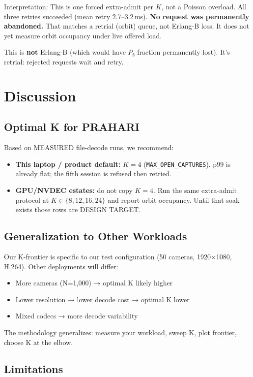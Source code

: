 \documentclass[sigconf,review]{acmart}
\begin{document}
Interpretation: This is one forced extra-admit per $K$, not a Poisson overload. All three retries succeeded (mean retry 2.7--3.2\,ms). \textbf{No request was permanently abandoned.} That matches a retrial (orbit) queue, not Erlang-B loss. It does not yet measure orbit occupancy under live offered load.

This is \textbf{not} Erlang-B (which would have $P_b$ fraction permanently lost). It's retrial: rejected requests wait
and retry.

\section{Discussion}

\subsection{Optimal K for PRAHARI}

Based on MEASURED file-decode runs, we recommend:
\begin{itemize}
  \item \textbf{This laptop / product default:} $K=4$ (\texttt{MAX\_OPEN\_CAPTURES}). p99 is already flat; the fifth session is refused then retried.
  \item \textbf{GPU/NVDEC estates:} do not copy $K=4$. Run the same extra-admit protocol at $K\in\{8,12,16,24\}$ and report orbit occupancy. Until that soak exists those rows are DESIGN TARGET.
\end{itemize}

\subsection{Generalization to Other Workloads}

Our K-frontier is specific to our test configuration (50 cameras, 1920×1080, H.264). Other deployments will differ:
\begin{itemize}
  \item More cameras (N=1,000) → optimal K likely higher
  \item Lower resolution → lower decode cost → optimal K lower
  \item Mixed codecs → more decode variability
\end{itemize}

The methodology generalizes: measure your workload, sweep K, plot frontier, choose K at the elbow.

\subsection{Limitations}
\end{document}
